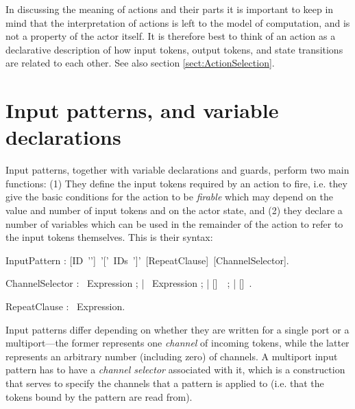 In discussing the meaning of actions and their parts it is important
to keep in mind that the interpretation
of actions is left to the model of computation, and is not a property
of the actor itself. It is therefore best to think of an action as a
declarative description of how input tokens, output tokens, and state
transitions are related to each other. See also section
\ref{sect:ActionSelection}.


\section{Input patterns, and variable
  declarations}\label{sect:InputPatterns}



Input patterns, together with variable declarations and guards,
perform two main functions: (1) They define the input tokens required
by an action to fire, i.e. they give the basic conditions for the
action to be {\em firable} which may depend on the value and number of
input tokens and on the actor state, and (2) they declare a number of
variables which can be used in the remainder of the action to refer to
the input tokens themselves. This is their syntax:


\bgr
InputPattern : [ID~'\charColon']~'['~IDs~']'~[RepeatClause]~[ChannelSelector].

ChannelSelector : \kwAt~Expression ;
     | \kwAtN~Expression ; 
     | [\kwAtN]~\kwAny~;
     | [\kwAtN]~\kwAll.

RepeatClause : \kwRepeat~Expression.
\egr


Input patterns differ depending on whether they are written for a
single port or a multiport---the former represents one {\em channel}
of incoming tokens, while the latter represents an arbitrary number
(including zero) of channels. A multiport input pattern has to have a
{\em channel selector} associated with it, which is a construction
that serves to specify the channels that a pattern is applied to
(i.e. that the tokens bound by the pattern are read from).

